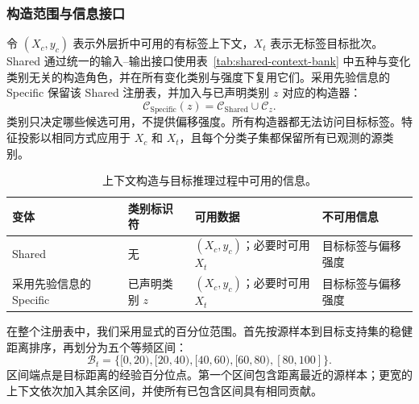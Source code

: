 \subsubsection{构造范围与信息接口}

令 $(X_c,y_c)$ 表示外层折中可用的有标签上下文，$X_t$ 表示无标签目标批次。Shared 通过统一的输入--输出接口使用表~\ref{tab:shared-context-bank} 中五种与变化类别无关的构造角色，并在所有变化类别与强度下复用它们。采用先验信息的 Specific 保留该 Shared 注册表，并加入与已声明类别 $z$ 对应的构造器：
\begin{equation}
  \mathcal C_{\mathrm{Specific}}(z)
  =\mathcal C_{\mathrm{Shared}}\cup\mathcal C_z.
  \label{eq:specific-context-bank}
\end{equation}
类别只决定哪些候选可用，不提供偏移强度。所有构造器都无法访问目标标签。特征投影以相同方式应用于 $X_c$ 和 $X_t$，且每个分类子集都保留所有已观测的源类别。

\begin{table}[H]
  \caption{上下文构造与目标推理过程中可用的信息。}
  \label{tab:context-information-interface}
  \centering
  \footnotesize
  \setlength{\tabcolsep}{4pt}
  \begin{tabular}{@{}>{\raggedright\arraybackslash}p{}
                      >{\raggedright\arraybackslash}p{}
                      >{\raggedright\arraybackslash}p{}
                      >{\raggedright\arraybackslash}p{}@{}}
    \toprule 变体&类别标识符&可用数据&不可用信息\\
    \midrule Shared&无& $(X_c,y_c)$；必要时可用 $X_t$
      &目标标签与偏移强度\\
采用先验信息的 Specific&已声明类别 $z$
      & $(X_c,y_c)$；必要时可用 $X_t$
      &目标标签与偏移强度\\
    \bottomrule
  \end{tabular}
\end{table}

在整个注册表中，我们采用显式的百分位范围。首先按源样本到目标支持集的稳健距离排序，再划分为五个等频区间：
\begin{equation}
  \mathcal B_t=\{[0,20),[20,40),[40,60),[60,80),[80,100]\}.
  \label{eq:target-support-bins}
\end{equation}
区间端点是目标距离的经验百分位点。第一个区间包含距离最近的源样本；更宽的上下文依次加入其余区间，并使所有已包含区间具有相同贡献。

